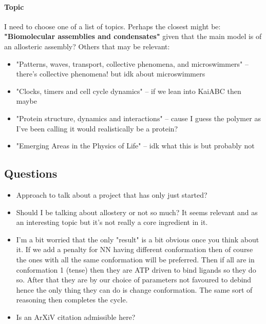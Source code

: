 \documentclass[11pt]{article}
\begin{document}
\paragraph{Topic}
I need to choose one of a list of topics.
Perhaps the closest might be: \textbf{"Biomolecular assemblies and condensates"} given that the main model is of an allosteric assembly?
Others that may be relevant:
\begin{itemize}
	\item "Patterns, waves, transport, collective phenomena, and microswimmers" -- there's collective phenomena! but idk about microswimmers
	\item "Clocks, timers and cell cycle dynamics" -- if we lean into KaiABC then maybe
	\item "Protein structure, dynamics and interactions" -- cause I guess the polymer as I've been calling it would realistically be a protein?
	\item "Emerging Areas in the Physics of Life" -- idk what this is but probably not
\end{itemize}

\subsection{Questions}
\begin{itemize}
	\item Approach to talk about a project that has only just started?
	\item Should I be talking about allostery or not so much? It seems relevant and as an interesting topic but it's not really a core ingredient in it.
	\item I'm a bit worried that the only "result" is a bit obvious once you think about it. If we add a penalty for NN having different conformation then of course the ones with all the same conformation will be preferred. Then if all are in conformation 1 (tense) then they are ATP driven to bind ligands so they do so. After that they are by our choice of parameters not favoured to debind hence the only thing they can do is change conformation. The same sort of reasoning then completes the cycle.
	\item Is an ArXiV citation admissible here?
\end{itemize}
\end{document}
